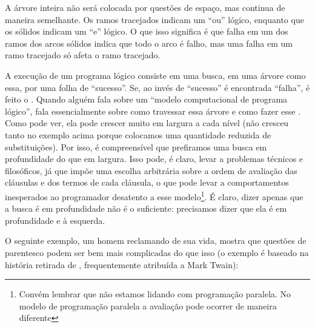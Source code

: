 \documentclass{article}
\begin{document}
A árvore inteira não será colocada por questões de espaço, mas continua de maneira semelhante. Os ramos tracejados indicam
um ``ou'' lógico, enquanto que os sólidos indicam um ``e'' lógico. O que isso significa é que falha em um dos ramos dos arcos
sólidos indica que todo o arco é falho, mas uma falha em um ramo tracejado só afeta o ramo tracejado.

A execução de um programa lógico consiste em uma busca, em uma árvore como essa, por uma folha de ``sucesso''. Se, ao invés
de ``sucesso'' é encontrada ``falha'', é feito o . Quando alguém fala sobre um ``modelo computacional de
programa lógico'', fala essencialmente sobre como travessar essa árvore e como fazer esse .
Como pode ver, ela pode crescer muito em largura a cada nível (não cresceu tanto no exemplo acima porque colocamos uma quantidade reduzida de substituições). Por isso, é compreensível que prefiramos uma busca em profundidade
do que em largura. Isso pode, é claro, levar a problemas técnicos e filosóficos, já que impõe uma escolha arbitrária sobre a ordem
de avaliação das cláusulas e dos termos de cada cláusula, o que pode levar a comportamentos inesperados ao programador desatento a esse modelo\footnote{Convém lembrar que não estamos lidando com programação paralela.
No modelo de programação paralela a avaliação pode ocorrer de maneira
diferente}. É claro, dizer apenas que a busca é em profundidade não é o suficiente: precisamos dizer que ela é em profundidade e
à esquerda.



O seguinte exemplo, um homem reclamando de sua vida, mostra que questões de parentesco podem ser bem
mais complicadas do que isso (o exemplo é baseado na história retirada de \cite{antoni}, frequentemente
atribuída a Mark Twain):

\end{document}
